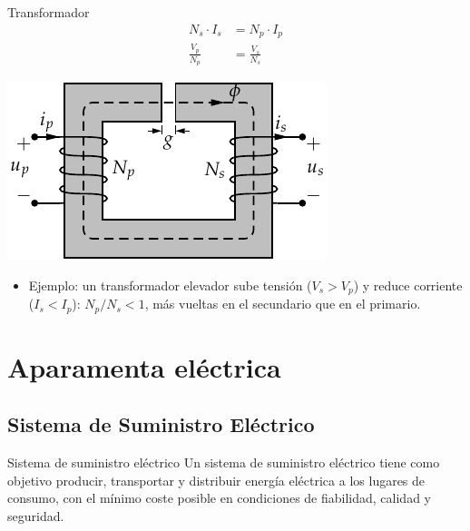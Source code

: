 \documentclass[xcolor={usenames,svgnames,dvipsnames}]{beamer}
\begin{document}
\begin{frame}[label={sec:org020d9c4}]{Transformador}
\begin{align*}
N_{s}\cdot I_{s} &= N_{p}\cdot I_{p}\\
\frac{V_{p}}{N_{p}} &= \frac{V_{s}}{N_{s}}
\end{align*}

\begin{center}
\includegraphics[height=0.3\textheight]{../figs/Transformador2.pdf}
\end{center}

\begin{itemize}
\item Ejemplo: un transformador elevador sube tensión (\(V_{s}>V_{p}\)) y reduce corriente (\(I_{s}<I_{p}\)): \(N_{p}/N_{s}<1\), más vueltas en el secundario que en el primario.
\end{itemize}
\end{frame}


\section{Aparamenta eléctrica}
\label{sec:org51e4688}

\subsection{Sistema de Suministro Eléctrico}
\label{sec:org0e18c9f}
\begin{frame}[label={sec:org2a45656}]{Sistema de suministro eléctrico}
Un \alert{sistema de suministro eléctrico} tiene como objetivo \alert{producir,
transportar y distribuir energía eléctrica} a los lugares de consumo,
con el mínimo coste posible en condiciones de \alert{fiabilidad, calidad y
seguridad}.
\end{frame}
\end{document}
